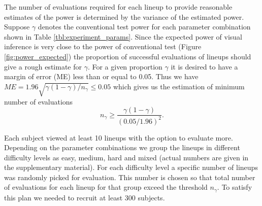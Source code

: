 \documentclass[12pt]{article}
\newcommand{\hh}[1]{{\color{orange} #1}} %
\begin{document}
The number of evaluations required for each lineup to provide reasonable estimates of the power is determined by the variance of the estimated power. Suppose $\gamma$ denotes the conventional test power for each parameter combination shown in Table \ref{tbl:experiment_params}. Since the expected power of visual inference is very close to the power of conventional test (Figure \ref{fig:power_expected}) the proportion of successful evaluations of lineups should give a rough estimate for  $\gamma$. 
For a given proportion $\gamma$ it is desired to have a margin of error (ME) less than or equal to 0.05. Thus we have $ME =1.96 \sqrt{ \gamma(1-\gamma) / n_{\gamma} } \le 0.05$ which gives us the estimation of minimum number of evaluations $$n_{\gamma} \geq \frac{\gamma(1-\gamma)}{(0.05/1.96)^2}.$$  

Each subject viewed at least 10 lineups with the option to evaluate more.
Depending on the parameter combinations we group the lineups in different difficulty levels  as easy, medium, hard and mixed (actual numbers are given in the supplementary material). For each difficulty level a specific number of lineups was randomly picked  for evaluation. This number is chosen so that total number of evaluations for each lineup for that group exceed the threshold $n_{\gamma}$. To satisfy this plan we needed to recruit at least 300 subjects. 

\begin{table}[hbtp]
\caption{Combination of parameter values, $\beta_2$,  $n$ and $\sigma$, used for each of the simulation experiments.} %
\centering
{}
\label{tbl:experiment_params}
\end{table} 
\end{document}
